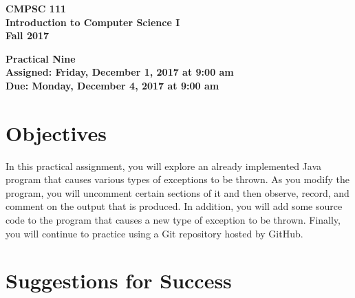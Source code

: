 \documentclass[11pt]{article}
\newcommand{\assignmentduedate}{December 4}
\newcommand{\assignmentassignedate}{December 1}
\newcommand{\assignmentnumber}{Nine}
\newcommand{\labyear}{2017}
\newcommand{\labdueday}{Monday}
\newcommand{\labassignday}{Friday}
\newcommand{\labtime}{9:00 am}
\newcommand{\assigneddate}{Assigned: \labassignday, \assignmentassignedate, \labyear{} at \labtime{}}
\newcommand{\duedate}{Due: \labdueday, \assignmentduedate, \labyear{} at \labtime{}}
\newcommand{\labtitle}[1]
{
  \begin{center}
    \begin{center}
      \bf
      CMPSC 111\\Introduction to Computer Science I\\
      Fall 2017\\
      \medskip
    \end{center}
    \bf
    #1
  \end{center}
}
\begin{document}
\thispagestyle{empty}

\labtitle{Practical \assignmentnumber{} \\ \assigneddate{} \\ \duedate{}}

\section*{Objectives}

In this practical assignment, you will explore an already implemented Java program that causes various types of
exceptions to be thrown. As you modify the program, you will uncomment certain sections of it and then observe, record,
and comment on the output that is produced. In addition, you will add some source code to the program that causes a new
type of exception to be thrown. Finally, you will continue to practice using a Git repository hosted by GitHub.

\section*{Suggestions for Success}
\end{document}
